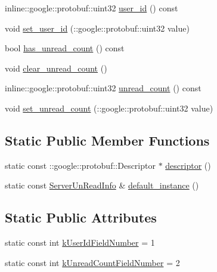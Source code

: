 \begin{DoxyCompactItemize}
inline\+::google\+::protobuf\+::uint32 \hyperlink{class_i_m_1_1_base_define_1_1_server_un_read_info_a9c66ecfd9b652b63430df672e0ad7534}{user\+\_\+id} () const 
\item 
void \hyperlink{class_i_m_1_1_base_define_1_1_server_un_read_info_a058a9a98cde1406b9fd34d2031300a13}{set\+\_\+user\+\_\+id} (\+::google\+::protobuf\+::uint32 value)
\item 
bool \hyperlink{class_i_m_1_1_base_define_1_1_server_un_read_info_aee2ea72d804e077dbe48dadd72ee9e50}{has\+\_\+unread\+\_\+count} () const 
\item 
void \hyperlink{class_i_m_1_1_base_define_1_1_server_un_read_info_ad09b1516b2b38fb60207ddfdbfa3ff9e}{clear\+\_\+unread\+\_\+count} ()
\item 
inline\+::google\+::protobuf\+::uint32 \hyperlink{class_i_m_1_1_base_define_1_1_server_un_read_info_af869435f40a3468acbebb7aa9da2ffd6}{unread\+\_\+count} () const 
\item 
void \hyperlink{class_i_m_1_1_base_define_1_1_server_un_read_info_aca4073fbf4d80a6676ba828266010d04}{set\+\_\+unread\+\_\+count} (\+::google\+::protobuf\+::uint32 value)
\end{DoxyCompactItemize}
\subsection*{Static Public Member Functions}
\begin{DoxyCompactItemize}
\item 
static const \+::google\+::protobuf\+::\+Descriptor $\ast$ \hyperlink{class_i_m_1_1_base_define_1_1_server_un_read_info_a3b08a751375b9b6511b32947ac1238ad}{descriptor} ()
\item 
static const \hyperlink{class_i_m_1_1_base_define_1_1_server_un_read_info}{Server\+Un\+Read\+Info} \& \hyperlink{class_i_m_1_1_base_define_1_1_server_un_read_info_a6d9898c9c15e03a616e3f32d9421f776}{default\+\_\+instance} ()
\end{DoxyCompactItemize}
\subsection*{Static Public Attributes}
\begin{DoxyCompactItemize}
\item 
static const int \hyperlink{class_i_m_1_1_base_define_1_1_server_un_read_info_a482be31f066cdb6df95c468d3259c981}{k\+User\+Id\+Field\+Number} = 1
\item 
static const int \hyperlink{class_i_m_1_1_base_define_1_1_server_un_read_info_a1235741395ad8f74c0e51239dc1ce506}{k\+Unread\+Count\+Field\+Number} = 2
\end{DoxyCompactItemize}
